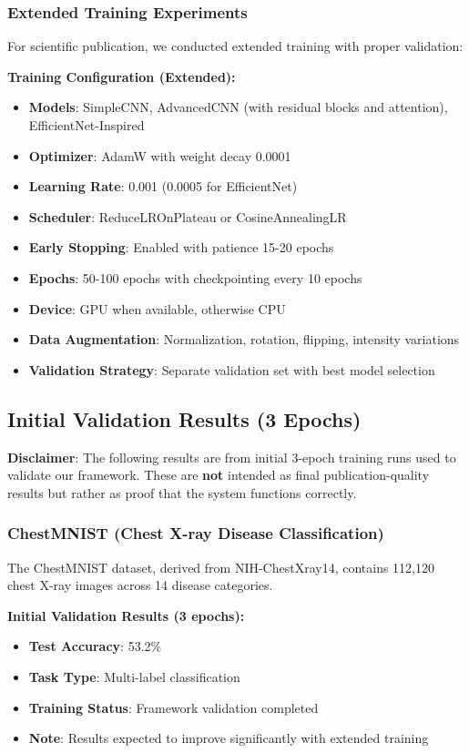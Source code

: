 \documentclass[12pt,a4paper]{article}
\begin{document}
\subsubsection{Extended Training Experiments}

For scientific publication, we conducted extended training with proper validation:

\textbf{Training Configuration (Extended):}
\begin{itemize}
    \item \textbf{Models}: SimpleCNN, AdvancedCNN (with residual blocks and attention), EfficientNet-Inspired
    \item \textbf{Optimizer}: AdamW with weight decay 0.0001
    \item \textbf{Learning Rate}: 0.001 (0.0005 for EfficientNet)
    \item \textbf{Scheduler}: ReduceLROnPlateau or CosineAnnealingLR
    \item \textbf{Early Stopping}: Enabled with patience 15-20 epochs
    \item \textbf{Epochs}: 50-100 epochs with checkpointing every 10 epochs
    \item \textbf{Device}: GPU when available, otherwise CPU
    \item \textbf{Data Augmentation}: Normalization, rotation, flipping, intensity variations
    \item \textbf{Validation Strategy}: Separate validation set with best model selection
\end{itemize}

\subsection{Initial Validation Results (3 Epochs)}

\textbf{Disclaimer}: The following results are from initial 3-epoch training runs used to validate our framework. These are \textbf{not} intended as final publication-quality results but rather as proof that the system functions correctly.

\subsubsection{ChestMNIST (Chest X-ray Disease Classification)}

The ChestMNIST dataset, derived from NIH-ChestXray14, contains 112,120 chest X-ray images across 14 disease categories.

\textbf{Initial Validation Results (3 epochs):}
\begin{itemize}
    \item \textbf{Test Accuracy}: 53.2\%
    \item \textbf{Task Type}: Multi-label classification
    \item \textbf{Training Status}: Framework validation completed
    \item \textbf{Note}: Results expected to improve significantly with extended training
\end{itemize}
\end{document}

